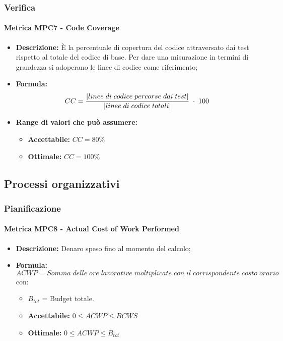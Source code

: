 \subsubsection{Verifica}
    \paragraph{Metrica MPC7 - Code Coverage}
    \begin{itemize}
        \item \textbf{Descrizione:} È la percentuale di copertura del codice attraversato dai test rispetto al totale del codice di base. Per dare una misurazione in termini di grandezza si adoperano le linee di codice come riferimento;
        \item \textbf{Formula:} $$CC = {|linee \; di \; codice \; percorse \; dai  \; test| \over |linee \; di \; codice \; totali|} \; \cdot \; 100$$
        \item \textbf{Range di valori che può assumere:}
        \begin{itemize}
            \item \textbf{Accettabile:} $CC = 80\%$
            \item \textbf{Ottimale:} $CC = 100\%$
        \end{itemize}
    \end{itemize}

\subsection{Processi organizzativi}

\subsubsection{Pianificazione}

\paragraph{Metrica MPC8 - Actual Cost of Work Performed}
\begin{itemize}
	\item \textbf{Descrizione:} Denaro speso fino al momento del calcolo;
	\item \textbf{Formula:} $$ACWP = {Somma\; delle\; ore\; lavorative\; moltiplicate\; con\; il\; corrispondente\; costo\; orario}$$
	con:
	\begin{itemize}
		\item $B_{tot}$ = Budget totale.
	\end{itemize}
	 \begin{itemize}
		\item \textbf{Accettabile:}  $0 \leq ACWP \leq BCWS$
		\item \textbf{Ottimale:} $0 \leq ACWP \leq B_{tot}$
	\end{itemize}
\end{itemize}

